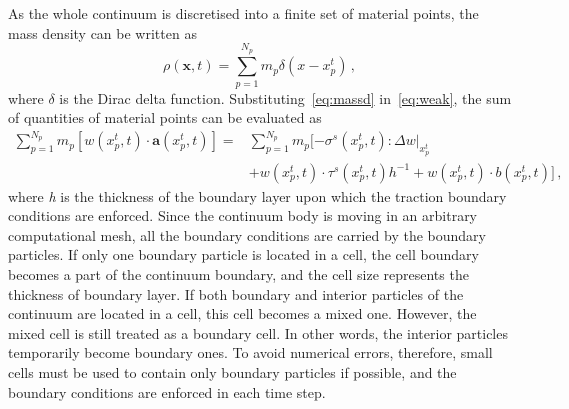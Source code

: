 As the whole continuum is discretised into a finite set of material points, the 
mass density can be written as
\begin{equation}
\rho(\mathbf{x},t)=\sum\limits_{\mathit{p}=1}^{\mathit{N}_{p}}
{\mathit{m}_{p}\delta(\mathbf{\mathit{x}}-\mathbf{\mathit{x}}_{p}^{t})} \,,
\label{eq:massd}
\end{equation}
where $\delta$ is the Dirac delta function. Substituting~\cref{eq:massd} 
in~\cref{eq:weak}, the sum of quantities of material points can be evaluated 
as
\begin{align}
\nonumber
\sum\limits_{\mathit{p}=1}^{\mathit{N}_{p}} 
\mathit{m}_{p}[\mathbf{\mathit{w}}(\mathit{x}_{p}^{t},t) \cdot 
\mathbf{a}(\mathit{x}_{p}^{t},t)] = & 
\sum\limits_{\mathit{p}=1}^{\mathit{N}_{p}} \mathit{m}_{p} 
[-\sigma^{s}(\mathit{x}_{p}^{t},t): \Delta 
\mathbf{\mathit{w}}|_{\mathit{x}_{p}^{t}} \\ 
& + \mathbf{\mathit{w}}(\mathit{x}_{p}^{t},t) \cdot 
\tau^{s}(\mathit{x}_{p}^{t},t)h^{-1} +  
\mathbf{\mathit{w}}(\mathit{x}_{p}^{t},t) \cdot 
\mathbf{\mathit{b}}(\mathit{x}_{p}^{t},t)] \,,
\label{eq:MPM}
\end{align}
where \textit{h} is the thickness of the boundary layer upon which the traction 
boundary conditions are enforced. Since the continuum body is moving in an 
arbitrary computational mesh, all the boundary conditions are carried by the 
boundary particles. If only one boundary particle is located in a cell, the 
cell boundary becomes a part of the continuum boundary, and the cell size 
represents the thickness of boundary layer. If both boundary and interior
particles of the continuum are located in a cell, this cell becomes a mixed 
one. However, the mixed cell is still treated as a boundary cell. In other 
words, the interior particles temporarily become boundary ones. To avoid
numerical errors, therefore, small cells must be used to contain only boundary 
particles if possible, and the boundary conditions are enforced in each 
time step.

